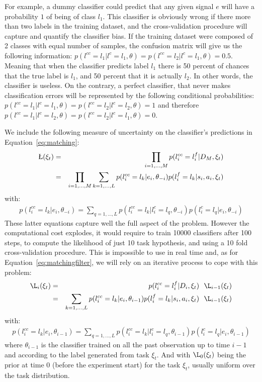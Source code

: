 For example, a dummy classifier could predict that any given signal $e$ will have a probability $1$ of being of class $l_1$. This classifier is obviously wrong if there more than two labels in the training dataset, and the cross-validation procedure will capture and quantify the classifier bias. If the training dataset were composed of 2 classes with equal number of samples, the confusion matrix will give us the following information: $p(l^{cc} = l_1| l^c = l_1, \theta) = p(l^{cc} = l_2| l^c = l_1, \theta) = 0.5$. Meaning that when the classifier predicts label $l_1$ there is 50 percent of chances that the true label is $l_1$, and 50 percent that it is actually $l_2$. In other words, the classifier is useless. On the contrary, a perfect classifier, that never makes classification errors will be represented by the following conditional probabilities: $p(l^{cc} = l_1| l^c = l_1, \theta) = p(l^{cc} = l_2| l^c = l_2, \theta) = 1$ and therefore $p(l^{cc} = l_1| l^c = l_2, \theta) = p(l^{cc} = l_2| l^c = l_1, \theta) = 0$.

We include the following measure of uncertainty on the classifier's predictions in Equation~\ref{eq:matching}:
%
\begin{eqnarray}
\L(\xi_t) &=& \prod_{i = 1,\ldots,M} p(l^{cc}_i = l^f_i | D_M, \xi_t) \nonumber \\ 
&=& \prod_{i = 1,\ldots,M} \sum_{k = 1, \ldots, L} p(l^{cc}_i = l_k | e_i, \theta_{-i}) p(l^f_i = l_k | s_i, a_i, \xi_t)
\label{eq:matchingcrossvalidation} 
\end{eqnarray}
%
with:
%
\begin{eqnarray}
p(l^{cc}_i = l_k | e_i, \theta_{-i}) =  \sum_{q = 1, \ldots, L} p(l^{cc}_i = l_k| l^c_i = l_q, \theta_{-i}) p(l^c_i = l_q | e_i, \theta_{-i})
\label{eq:confusion} 
\end{eqnarray}
%
These latter equations capture well the full aspect of the problem. However the computational cost explodes, it would require to train 10000 classifiers after 100 steps, to compute the likelihood of just 10 task hypothesis, and using a 10 fold cross-validation procedure. This is impossible to use in real time and, as for Equation~\ref{eq:matchingfilter}, we will rely on an iterative process to cope with this problem:
%
\begin{eqnarray}
\L_i(\xi_t) &=& p(l^{cc}_i = l^f_i | D_i, \xi_t) ~~ \L_{i-1}(\xi_t) \nonumber \\ 
&=& \sum_{k = 1, \ldots, L} p(l^{cc}_i = l_k | e_i, \theta_{i-1}) p(l^f_i = l_k | s_i, a_i, \xi_t) ~~ \L_{i-1}(\xi_t)
\label{eq:matchingfiltercrossvalidation} 
\end{eqnarray}
%
with:
%
\begin{eqnarray}
p(l^{cc}_i = l_k | e_i, \theta_{i-1}) =  \sum_{q = 1, \ldots, L} p(l^{cc}_i = l_k| l^c_i = l_q, \theta_{i-1}) p(l^c_i = l_q | e_i, \theta_{i-1})
\label{eq:confusionfilter} 
\end{eqnarray}
%
where $\theta_{i-1}$ is the classifier trained on all the past observation up to time $i-1$ and according to the label generated from task $\xi_t$. And with $\L_{0}(\xi_t)$ being the prior at time 0 (before the experiment start) for the task $\xi_t$, usually uniform over the task distribution.

